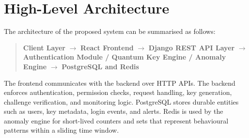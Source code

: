 \documentclass[12pt,a4paper]{report}
\begin{document}
\section{High-Level Architecture}
\noindent The architecture of the proposed system can be summarised as follows:

\begin{quote}
\noindent \textbf{Client Layer} $\rightarrow$ \textbf{React Frontend} $\rightarrow$ \textbf{Django REST API Layer} $\rightarrow$ \textbf{Authentication Module / Quantum Key Engine / Anomaly Engine} $\rightarrow$ \textbf{PostgreSQL and Redis}
\end{quote}

The frontend communicates with the backend over HTTP APIs. The backend enforces authentication, permission checks, request handling, key generation, challenge verification, and monitoring logic. PostgreSQL stores durable entities such as users, key metadata, login events, and alerts. Redis is used by the anomaly engine for short-lived counters and sets that represent behavioural patterns within a sliding time window.
\end{document}
